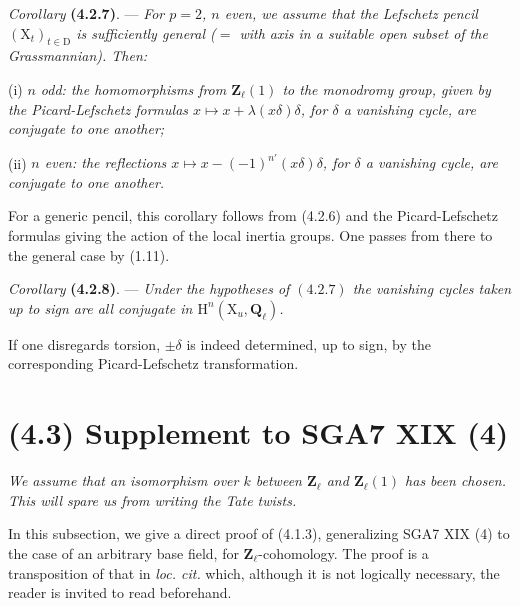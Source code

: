 \documentclass[11pt,leqno]{article}
\begin{document}
\textit{Corollary} \textbf{(4.2.7)}. — \textit{For \(p=2\), \(n\) even, we assume that the Lefschetz pencil \((\mathrm{X}_t)_{t\in\mathrm{D}}\) is sufficiently general (\(=\) with axis in a suitable open subset of the Grassmannian). Then:}

(i) \textit{\(n\) odd: the homomorphisms from \(\mathbf{Z}_\ell(1)\) to the monodromy group, given by the Picard-Lefschetz formulas \(x\mapsto x+\lambda(x\delta)\delta\), for \(\delta\) a vanishing cycle, are conjugate to one another;}

(ii) \textit{\(n\) even: the reflections \(x\mapsto x-(-1)^{n'}(x\delta)\delta\), for \(\delta\) a vanishing cycle, are conjugate to one another.}

For a generic pencil, this corollary follows from (4.2.6) and the Picard-Lefschetz formulas giving the action of the local inertia groups. One passes from there to the general case by (1.11).

\textit{Corollary} \textbf{(4.2.8)}. — \textit{Under the hypotheses of \((4.2.7)\) the vanishing cycles taken up to sign are all conjugate in \(\mathrm{H}^n(\mathrm{X}_u,\mathbf{Q}_\ell)\).}

If one disregards torsion, \(\pm\delta\) is indeed determined, up to sign, by the corresponding Picard-Lefschetz transformation.

\section*{(4.3) Supplement to SGA7 XIX (4)}

\textit{We assume that an isomorphism over \(k\) between \(\mathbf{Z}_\ell\) and \(\mathbf{Z}_\ell(1)\) has been chosen. This will spare us from writing the Tate twists.}

In this subsection, we give a direct proof of (4.1.3), generalizing SGA7 XIX (4) to the case of an arbitrary base field, for \(\mathbf{Z}_\ell\)-cohomology. The proof is a transposition of that in \textit{loc. cit.} which, although it is not logically necessary, the reader is invited to read beforehand.
\end{document}
